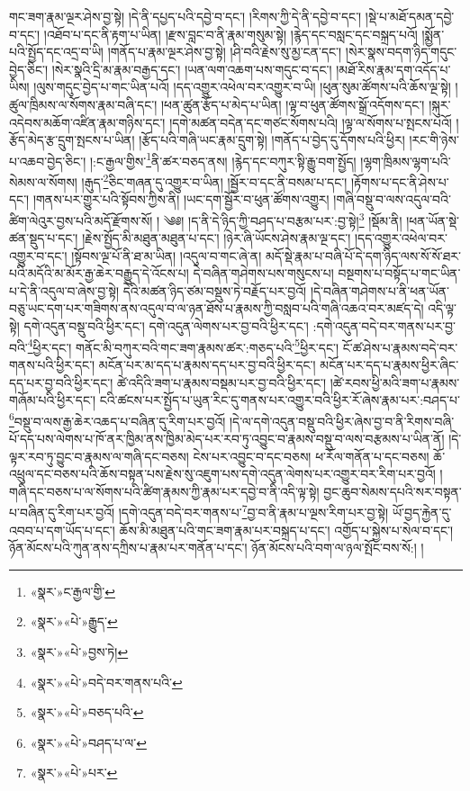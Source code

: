 གང་ཟག་རྣམ་ལྔར་ཤེས་བྱ་སྟེ། །དེ་ནི་དཔྱད་པའི་དབྱེ་བ་དང་། །རིགས་ཀྱི་དེ་ནི་དབྱེ་བ་དང་། །སྡེ་པ་མཐོ་དམན་དབྱེ་བ་དང་། །འཐོབ་པ་དང་ནི་རྟག་པ་ཡིན། །རྫས་བླང་བ་ནི་རྣམ་གསུམ་སྟེ། །རྙེད་དང་བསླང་དང་བསྐྲད་པའོ། །སྨྱོན་པའི་སྤྱོད་དང་འདྲ་བ་ཡི། །གནོད་པ་རྣམ་ལྔར་ཤེས་བྱ་སྟེ། །ཤི་བའི་རྗེས་སུ་མྱ་ངན་དང་། །སེར་སྣས་བདག་ཉིད་གདུང་བྱེད་ཅིང་། །སེར་སྣའི་དྲི་མ་རྣམ་བརྒྱད་དང་། །ཡན་ལག་འཆག་པས་གདུང་བ་དང་། །མཐོ་རིས་རྣམ་དག་འདོད་པ་ཡིས། །ལུས་གདུང་བྱེད་པ་གང་ཡིན་པའོ། །དད་འགྱུར་འཕེལ་བར་འགྱུར་བ་ཡི། །ཕུན་སུམ་ཚོགས་པའི་ཆོས་ལྔ་སྟེ། །ཚུལ་ཁྲིམས་ལ་སོགས་རྣམ་བཞི་དང་། །ཕན་ཚུན་རྩོད་པ་མེད་པ་ཡིན། །ལྟ་བ་ཕུན་ཚོགས་སྒྲོ་འདོགས་དང་། །སྐུར་འདེབས་མཆོག་འཛིན་རྣམ་གཉིས་དང་། །དགེ་མཚན་བདེན་དང་གཙང་སོགས་པའི། །ལྟ་ལ་སོགས་པ་སྤངས་པའོ། །རྩོད་མེད་རྩ་དྲུག་སྤངས་པ་ཡིན། །རྩོད་པའི་གཞི་ཡང་རྣམ་དྲུག་སྟེ། །གནོད་པ་བྱེད་དུ་དོགས་པའི་ཕྱིར། །རང་གི་ཉེས་པ་འཆབ་བྱེད་ཅིང་། །:ང་རྒྱལ་གྱིས་\footnote{«སྣར་»ང་རྒྱལ་གྱི་}ནི་ཚར་བཅད་ནས། །རྙེད་དང་བཀུར་སྟི་རྒྱུ་བག་སྤྱོད། །ལྷག་ཁྲིམས་ལྷག་པའི་སེམས་ལ་སོགས། །རྒུད་\footnote{«སྣར་»«པེ་»རྒྱུད་}ཅིང་གཞན་དུ་འགྱུར་བ་ཡིན། །སྦྱོར་བ་དང་ནི་བསམ་པ་དང་། །རྟོགས་པ་དང་ནི་ཤེས་པ་དང་། །གནས་པར་གྱུར་པའི་སྟོབས་ཀྱིས་ནི། །ཡང་དག་སྦྱོར་བ་ཕུན་ཚོགས་འགྱུར། །གཞི་བསྡུ་བ་ལས་འདུལ་བའི་ཚིག་ལེའུར་བྱས་པའི་མདོ་རྫོགས་སོ། ། ༄༅། །ད་ནི་དེ་ཉིད་ཀྱི་བཤད་པ་བརྩམ་པར་:བྱ་སྟེ།\footnote{«སྣར་»«པེ་»བྱས་ཏེ།} །སྡོམ་ནི། །ཕན་ཡོན་སྡེ་ཚན་སྡུད་པ་དང་། །རྗེས་སྤྱོད་མི་མཐུན་མཐུན་པ་དང་། །ཉེར་ཞི་ཡོངས་ཤེས་རྣམ་ལྔ་དང་། །དད་འགྱུར་འཕེལ་བར་འགྱུར་བ་དང་། །སྟོབས་ལྔ་པོ་ནི་ཐ་མ་ཡིན། །འདུལ་བ་གང་ཞེ་ན། མདོ་སྡེ་རྣམ་པ་བཞི་པོ་དེ་དག་ཉིད་ལས་སོ་སོ་ཐར་པའི་མདོའི་མ་མོར་རྒྱ་ཆེར་བརྒྱུད་དེ་འོངས་པ། དེ་བཞིན་གཤེགས་པས་གསུངས་པ། བསྔགས་པ་བསྟོད་པ་གང་ཡིན་པ་དེ་ནི་འདུལ་བ་ཞེས་བྱ་སྟེ། དེའི་མཚན་ཉིད་ཙམ་བསྡུས་ཏེ་བརྗོད་པར་བྱའོ། །དེ་བཞིན་གཤེགས་པ་ནི་ཕན་ཡོན་བཅུ་ཡང་དག་པར་གཟིགས་ནས་འདུལ་བ་ལ་ཉན་ཐོས་པ་རྣམས་ཀྱི་བསླབ་པའི་གཞི་འཆའ་བར་མཛད་དེ། འདི་ལྟ་སྟེ། དགེ་འདུན་བསྡུ་བའི་ཕྱིར་དང་། དགེ་འདུན་ལེགས་པར་བྱ་བའི་ཕྱིར་དང་། :དགེ་འདུན་བདེ་བར་གནས་པར་བྱ་བའི་\footnote{«སྣར་»«པེ་»བདེ་བར་གནས་པའི་}ཕྱིར་དང་། གནོང་མི་བཀུར་བའི་གང་ཟག་རྣམས་ཚར་:གཅད་པའི་\footnote{«སྣར་»«པེ་»བཅད་པའི་}ཕྱིར་དང་། ངོ་ཚ་ཤེས་པ་རྣམས་བདེ་བར་གནས་པའི་ཕྱིར་དང་། མངོན་པར་མ་དད་པ་རྣམས་དད་པར་བྱ་བའི་ཕྱིར་དང་། མངོན་པར་དད་པ་རྣམས་ཕྱིར་ཞིང་དད་པར་བྱ་བའི་ཕྱིར་དང་། ཚེ་འདིའི་ཟག་པ་རྣམས་བསྡམ་པར་བྱ་བའི་ཕྱིར་དང་། །ཚེ་རབས་ཕྱི་མའི་ཟག་པ་རྣམས་གཞོམ་པའི་ཕྱིར་དང་། ངའི་ཚངས་པར་སྤྱོད་པ་ཡུན་རིང་དུ་གནས་པར་འགྱུར་བའི་ཕྱིར་རོ་ཞེས་རྣམ་པར་:བཤད་པ་\footnote{«སྣར་»«པེ་»བཤད་པ་ལ་}བསྡུ་བ་ལས་རྒྱ་ཆེར་འཆད་པ་བཞིན་དུ་རིག་པར་བྱའོ། །དེ་ལ་དགེ་འདུན་བསྡུ་བའི་ཕྱིར་ཞེས་བྱ་བ་ནི་རིགས་བཞི་པོ་དད་པས་ལེགས་པ་ཁོ་ནར་ཁྱིམ་ནས་ཁྱིམ་མེད་པར་རབ་ཏུ་འབྱུང་བ་རྣམས་བསྡུ་བ་ལས་བརྩམས་པ་ཡིན་ནོ། །དེ་ལྟར་རབ་ཏུ་བྱུང་བ་རྣམས་ལ་གཞི་དང་བཅས། ངེས་པར་འབྱུང་བ་དང་བཅས། ཕ་རོལ་གནོན་པ་དང་བཅས། ཆོ་འཕྲུལ་དང་བཅས་པའི་ཆོས་བསྟན་པས་རྗེས་སུ་འཇུག་པས་དགེ་འདུན་ལེགས་པར་འགྱུར་བར་རིག་པར་བྱའོ། །གཞི་དང་བཅས་པ་ལ་སོགས་པའི་ཚིག་རྣམས་ཀྱི་རྣམ་པར་དབྱེ་བ་ནི་འདི་ལྟ་སྟེ། བྱང་ཆུབ་སེམས་དཔའི་སར་བསྟན་པ་བཞིན་དུ་རིག་པར་བྱའོ། །དགེ་འདུན་བདེ་བར་གནས་པ་\footnote{«སྣར་»«པེ་»པར་}བྱ་བ་ནི་རྣམ་པ་ལྔས་རིག་པར་བྱ་སྟེ། ཡོ་བྱད་རྐྱེན་དུ་འབབ་པ་དག་ཡོད་པ་དང་། ཆོས་མི་མཐུན་པའི་གང་ཟག་རྣམ་པར་བསྐྲད་པ་དང་། འགྱོད་པ་སྐྱེས་པ་སེལ་བ་དང་། ཉོན་མོངས་པའི་ཀུན་ནས་དཀྲིས་པ་རྣམ་པར་གནོན་པ་དང་། ཉོན་མོངས་པའི་བག་ལ་ཉལ་སྤོང་བས་སོ:། །
